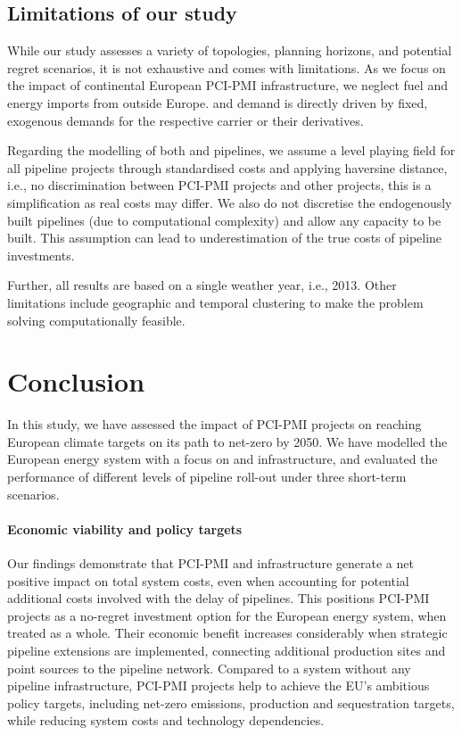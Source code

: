 \documentclass[preprint,12pt,sort&compress]{elsarticle}
\begin{document}
\subsection{Limitations of our study}
\label{sec:limitations}
While our study assesses a variety of topologies, planning horizons, and potential regret scenarios, it is not exhaustive and comes with limitations.
As we focus on the impact of continental European PCI-PMI infrastructure, we neglect fuel and energy imports from outside Europe.  and  demand is directly driven by fixed, exogenous demands for the respective carrier or their derivatives.

Regarding the modelling of both  and  pipelines, we assume a level playing field for all pipeline projects through standardised costs and applying haversine distance, i.e., no discrimination between PCI-PMI projects and other projects, this is a simplification as real costs may differ. We also do not discretise the endogenously built pipelines (due to computational complexity) and allow any capacity to be built. This assumption can lead to underestimation of the true costs of pipeline investments.

Further, all results are based on a single weather year, i.e., 2013.
Other limitations include geographic and temporal clustering to make the problem solving computationally feasible.
\section{Conclusion}
\label{sec:conclusion}

In this study, we have assessed the impact of PCI-PMI projects on reaching European climate targets on its path to net-zero by 2050. We have modelled the European energy system with a focus on  and  infrastructure, and evaluated the performance of different levels of pipeline roll-out under three short-term scenarios. 


\paragraph{Economic viability and policy targets}
Our findings demonstrate that PCI-PMI  and  infrastructure generate a net positive impact on total system costs, even when accounting for potential additional costs involved with the delay of pipelines. This positions PCI-PMI projects as a no-regret investment option for the European energy system, when treated as a whole.
Their economic benefit increases considerably when strategic pipeline extensions are implemented, connecting additional  production sites and  point sources to the pipeline network. 
Compared to a system without any pipeline infrastructure, PCI-PMI projects help to achieve the EU's ambitious policy targets, including net-zero emissions,  production and  sequestration targets, while reducing system costs and technology dependencies.
\end{document}
